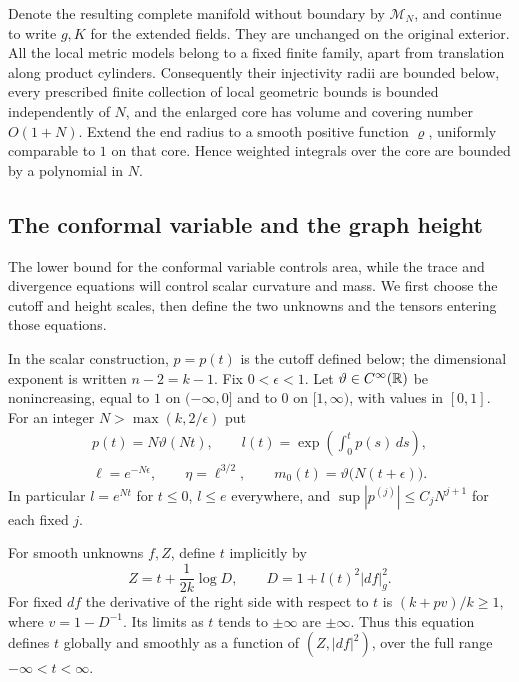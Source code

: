 Denote the resulting complete manifold without boundary by
$\mathcal M_N$, and continue to write $g,K$ for the extended fields.
They are unchanged on the original exterior.  All the local metric
models belong to a fixed finite family, apart from translation along
product cylinders.  Consequently their injectivity radii are bounded
below, every prescribed finite collection of local geometric bounds
is bounded independently of $N$, and the enlarged core has volume and
covering number $O(1+N)$.  Extend the end radius to a smooth positive
function $\varrho$,
uniformly comparable to $1$ on that core.  Hence weighted integrals
over the core are bounded by a polynomial in $N$.

\subsection{The conformal variable and the graph height}

The lower bound for the conformal variable controls area, while the
trace and divergence equations will control scalar curvature and mass.
We first choose the cutoff and height scales, then define the two
unknowns and the tensors entering those equations.

In the scalar construction, $p=p(t)$ is the cutoff defined below;
the dimensional exponent is written $n-2=k-1$.
Fix $0<\epsilon<1$.  Let $\vartheta\in C^\infty(\mathbb R)$ be nonincreasing,
equal to $1$ on $(-\infty,0]$ and to $0$ on $[1,\infty)$, with values
in $[0,1]$.  For an integer $N>\max(k,2/\epsilon)$ put
\begin{equation}
 \begin{gathered}
 p(t)=N\vartheta(Nt),\qquad
 l(t)=\exp\left(\int_0^t p(s)\,ds\right),\\
 \ell=e^{-N\epsilon},\qquad \eta=\ell^{3/2},\qquad
 m_0(t)=\vartheta\bigl(N(t+\epsilon)\bigr).
 \end{gathered}
 \label{eq:scalar:parameters}
\end{equation}
In particular $l=e^{Nt}$ for $t\leq0$, $l\leq e$ everywhere, and
$\sup|p^{(j)}|\leq C_jN^{j+1}$ for each fixed $j$.

For smooth unknowns $f,Z$, define $t$ implicitly by
\begin{equation}
 Z=t+\frac{1}{2k}\log D,\qquad D=1+l(t)^2|df|_g^2.
 \label{eq:scalar:implicit}
\end{equation}
For fixed $df$ the derivative of the right side with respect to $t$
is $(k+pv)/k\geq1$, where $v=1-D^{-1}$.  Its limits as $t$ tends to
$\pm\infty$ are $\pm\infty$.  Thus this equation defines $t$ globally and smoothly as a function
of $(Z,|df|^2)$, over the full range $-\infty<t<\infty$.

